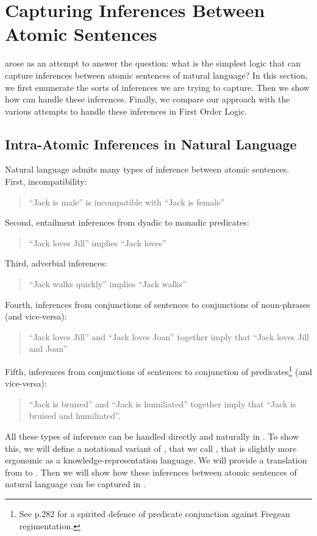
\section{Capturing Inferences Between Atomic Sentences}
\ELFULL{} arose as an attempt to answer the question: what is the simplest logic that can capture inferences between atomic sentences of natural language? 
In this section, we first enumerate the sorts of inferences we are trying to capture.
Then we show how \ELABR{} can handle these inferences.
Finally, we compare our approach with the various attempts to handle these inferences in First Order Logic.

\subsection{Intra-Atomic Inferences in Natural Language}
Natural language admits many types of inference between atomic sentences.
First, incompatibility:
\begin{quote}
``Jack is male'' is incompatible with ``Jack is female''
\end{quote}
Second, entailment inferences from dyadic to monadic predicates:
\begin{quote}
``Jack loves Jill'' implies ``Jack loves''
\end{quote}
Third, adverbial inferences:
\begin{quote}
``Jack walks quickly'' implies ``Jack walks''
\end{quote}
Fourth, inferences from conjunctions of sentences to conjunctions of noun-phrases (and vice-versa):
\begin{quote}
``Jack loves Jill'' and ``Jack loves Joan'' together imply that ``Jack loves Jill and Joan''
\end{quote}
Fifth, inferences from conjunctions of sentences to conjunction of predicates\footnote{See \cite{sommers} p.282 for a spirited defence of predicate conjunction against Fregean regimentation.} (and vice-versa):
\begin{quote}
``Jack is bruised'' and ``Jack is humiliated'' together imply that ``Jack is bruised and humiliated''.
\end{quote}

All these types of inference can be handled directly and naturally in \ELABR{}.
To show this, we will define a notational variant of \ELABR{}, that we call {\bf \ELKR{}}, that is slightly more ergonomic as a knowledge-representation language. We will provide a translation from \ELKR{} to \ELABR{}.
Then we will show how these inferences between atomic sentences of natural language can be captured in \ELKR{}.

